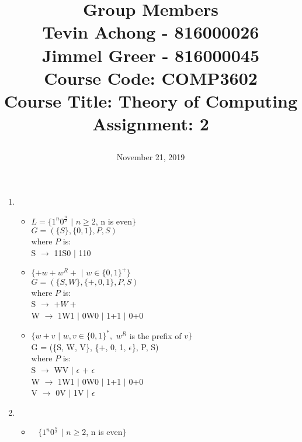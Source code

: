 \documentclass[a4paper, 12pt]{article}
\begin{document}
\title{
		\textbf{Group Members}\\ 
		Tevin Achong - 816000026\\
		Jimmel Greer - 816000045\\
		\textbf{Course Code:} COMP3602\\
		\textbf{Course Title:} Theory of Computing\\
		\textbf{Assignment:} 2
		\date{November 21, 2019}
}
\maketitle

\newpage
\begin{enumerate}
\item ~

\begin{itemize}
\item
$L = \{1^n0^{\frac{n}{2}}$ $\vert$ $n \geq 2$, n is even$\}$\\
$G = (\{S\}, \{0, 1\}, P, S)$\\
where $P$ is:\\
S $\rightarrow$ 11S0 $\vert$ 110

\item
$\{+w+w^R+$ $\vert$ $w \in \{0,1\}^+\}$\\
$G = (\{S, W\}, \{+, 0, 1\}, P, S)$\\
where $P$ is:\\
S $\rightarrow$ $+W+$\\
W $\rightarrow$ 1W1 $\vert$ 0W0 $\vert$ 1+1 $\vert$ 0+0\\

\item
$\{w+v$ $\vert$ $w, v \in \{0,1\}^*,$ $w^R$ is the prefix of $v\}$\\
G = (\{S, W, V\}, \{+, 0, 1, $\epsilon$\}, P, S)\\
where $P$ is:\\
S $\rightarrow$ WV $\vert$ $\epsilon$ $+$ $\epsilon$\\
W $\rightarrow$ 1W1 $\vert$ 0W0 $\vert$ 1+1 $\vert$ 0+0\\
V $\rightarrow$ 0V $\vert$ 1V $\vert$ $\epsilon$\\

\vspace{3cm}
\end{itemize}

\item ~
\begin{itemize}
\item ~
$\{1^n0^{\frac{n}{2}}$ $\vert$ $n \geq 2$, n is even$\}$
\begin{figure}[H]
	\centering
	\begin{tikzpicture}
		

\end{tikzpicture}
\end{figure}
\end{itemize}
\end{enumerate}
\end{document}
